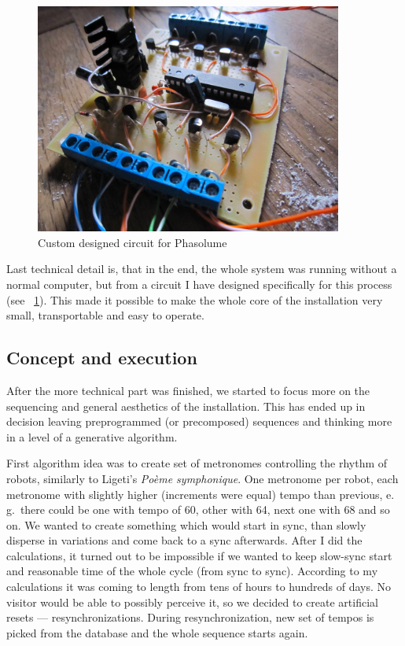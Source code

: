 \documentclass[12pt,a4paper,oneside]{report}
\begin{document}
\begin{figure}  
  \centering
    \includegraphics[width=0.9\textwidth]{img/phasolume}
	\caption{Custom designed circuit for Phasolume}
	\label{fig:phasolume}
\end{figure}

Last technical detail is, that in the end, the whole system was running without a normal computer, but from a circuit I have designed specifically for this process (see ~\ref{fig:phasolume}). This made it possible to make the whole core of the installation very small, transportable and easy to operate.

\subsection{Concept and execution} After the more technical part was finished, we started to focus more on the sequencing and general aesthetics of the installation. This has ended up in decision leaving preprogrammed (or precomposed) sequences and thinking more in a level of a generative algorithm. 

First algorithm idea was to create set of metronomes controlling the rhythm of robots, similarly to Ligeti's \emph{Poème symphonique}. One metronome per robot, each metronome with slightly higher (increments were equal) tempo than previous, e. g.\ there could be one with tempo of 60, other with 64, next one with 68 and so on. We wanted to create something which would start in sync, than slowly disperse in variations and come back to a sync afterwards. After I did the calculations, it turned out to be impossible if we wanted to keep slow-sync start and reasonable time of the whole cycle (from sync to sync). According to my calculations it was coming to length from tens of hours to hundreds of days. No visitor would be able to possibly perceive it, so we decided to create artificial resets --- resynchronizations. During resynchronization, new set of tempos is picked from the database and the whole sequence starts again.
\end{document}
